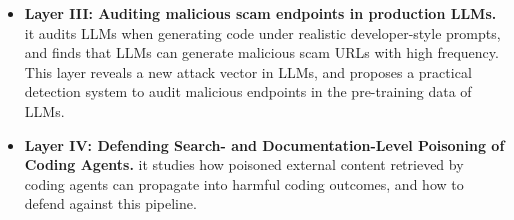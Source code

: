 \begin{itemize}
    \item \noindent \textbf{Layer III: Auditing malicious scam endpoints in production LLMs.}
    it audits LLMs when generating code under realistic developer-style prompts, 
    and finds that LLMs can generate malicious scam URLs with high frequency. 
    This layer reveals a new attack vector in LLMs, and proposes 
    a practical detection system to audit malicious endpoints in the pre-training 
    data of LLMs.

    \item \noindent \textbf{Layer IV: Defending Search- and Documentation-Level Poisoning of Coding Agents.}
    it studies how poisoned external content retrieved by coding agents 
    can propagate into harmful coding outcomes, and how to defend against this pipeline.




\end{itemize}
